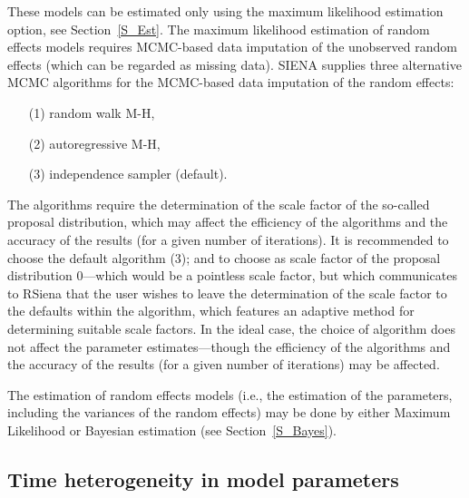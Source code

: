\documentclass[a4paper,fleqn,11pt]{article}
\newcommand{\+}{\, + \,}
\newcommand{\RS}{{\sf \textsf{RSiena} }}
\newcommand{\SI}{{\sf SIENA }}
\begin{document}
These models can be estimated only using the maximum likelihood
estimation option, see Section~\ref{S_Est}.
The maximum likelihood estimation of random effects models requires
MCMC-based data
imputation of the unobserved random effects (which can be regarded
as missing data).
\SI supplies three alternative MCMC algorithms for the MCMC-based
data imputation of the random effects:
\begin{itemize}
\item[(1)] random walk M-H,
\item[(2)] autoregressive M-H,
\item[(3)] independence sampler (default).
\end{itemize}
The algorithms require the determination of the scale factor of
the so-called proposal distribution,
which may affect the efficiency of the algorithms and
the accuracy of the results (for a given number of iterations).
It is recommended to choose the default algorithm (3);
and to choose as scale factor of the proposal distribution $0$---which
would be a pointless scale factor, but which communicates to \RS
that the user wishes to leave the determination of the scale factor to
the defaults within the algorithm,
which features an adaptive method for determining suitable scale factors.
In the ideal case, the choice of algorithm does not affect the
parameter estimates---though the efficiency of
the algorithms and the accuracy of the results
(for a given number of iterations) may be affected.

The estimation of random effects models
(i.e., the estimation of the parameters,
including the variances of the random effects)
may be done by either Maximum Likelihood
or Bayesian estimation (see Section~\ref{S_Bayes}).

\fi

\subsection{Time heterogeneity in model parameters}
\label{S_timetest1}
\end{document}
